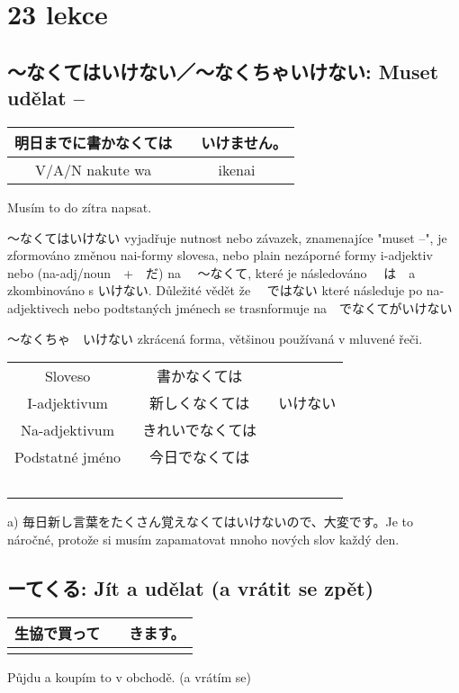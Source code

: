\section{23 lekce}




\subsection{〜なくてはいけない／〜なくちゃいけない: Muset udělat --}



\begin{tabular}{||c|c||}
\hline
明日までに書かなくては&　いけません。\\
\hline
V/A/N nakute wa& ikenai\\
\hline
\end{tabular}

Musím to do zítra napsat.

〜なくてはいけない vyjadřuje nutnost nebo závazek, znamenajíce "muset --", je zformováno změnou nai-formy slovesa, nebo plain nezáporné formy i-adjektiv nebo (na-adj/noun　+　だ) na 　〜なくて, které je následováno 　は　a zkombinováno s いけない. Důležité vědět že 　ではない které následuje po na-adjektivech nebo podtstaných jménech se trasnformuje na　でなくてがいけない

〜なくちゃ　いけない zkrácená forma, většinou používaná v mluvené řeči.

\begin{tabular}{|c|c|c|}
\hline
Sloveso &書かなくては&\\
I-adjektivum&新しくなくては		&			いけない\\
Na-adjektivum&きれいでなくては&\\
Podstatné jméno&今日でなくては　　&\\
\hline　　
\end{tabular}


a) 毎日新し言葉をたくさん覚えなくてはいけないので、大変です。Je to náročné, protože si musím zapamatovat mnoho nových slov každý den.

\subsection{ーてくる: Jít a udělat (a vrátit se zpět)}
\begin{tabular}{||c|c||}
\hline
生協で買って&　きます。\\
\hline
&\\
\hline
\end{tabular}
Půjdu a koupím to v obchodě. (a vrátím se)

